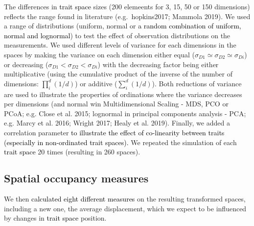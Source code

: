 \documentclass[]{article}
\begin{document}
The differences in \textcolor{black}{trait space} sizes (200
elemeents for 3, 15, 50 or 150 dimensions) reflects the range found in
literature (e.g.~hopkins2017; Mammola 2019). We used a range of
distributions (uniform, normal or
\textcolor{black}{a random combination of uniform, normal and lognormal})
to test the effect of observation distributions on the measurements. We
used different levels of variance for each dimensions in the spaces by
making the variance on each dimension either equal
(\(\sigma_{D1} \simeq \sigma_{D2} \simeq \sigma_{Di}\)) or decreasing
(\(\sigma_{D1} < \sigma_{D2} < \sigma_{Di}\)) with the decreasing factor
being either multiplicative (using the cumulative product of the inverse
of the number of dimensions: \(\prod_i^d(1/d)\)) or additive
(\(\sum_i^d(1/d)\)). Both reductions of variance are used to illustrate
the properties of ordinations where the variance decreases per
dimensions (and normal win Multidimensional Scaling - MDS, PCO or PCoA;
e.g. Close et al. 2015; lognormal in principal components analysis -
PCA; e.g. Marcy et al. 2016; Wright 2017; Healy et al. 2019). Finally,
we added a correlation parameter
\textcolor{black}{to illustrate the effect of co-linearity between traits (especially in non-ordinated trait spaces).}
We repeated the simulation of each
\textcolor{black}{trait space} 20 times (resulting in 260
spaces).

\subsection{Spatial occupancy
measures}\label{spatial-occupancy-measures}

We then
\textcolor{black}{ calculated eight different measures } on
the resulting transformed spaces, including a new one, the average
displacement, which we expect to be influenced by changes in
\textcolor{black}{trait space} position.

\renewcommand\baselinestretch{1}\selectfont
\end{document}
